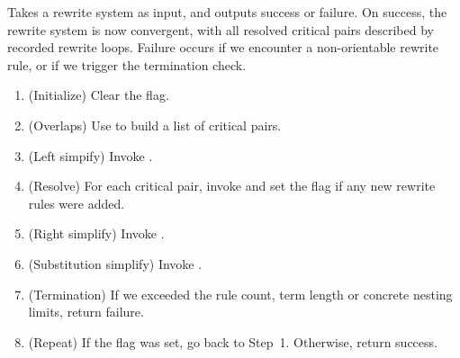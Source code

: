 \documentclass[../generics]{subfiles}
\begin{document}
\begin{algorithm}\label{knuthbendix} Takes a rewrite system as input, and outputs success or failure. On success, the rewrite system is now convergent, with all resolved critical pairs described by recorded rewrite loops. Failure occurs if we encounter a non-orientable rewrite rule, or if we trigger the termination check.
\begin{enumerate}
\item (Initialize) Clear the flag.
\item (Overlaps) Use  to build a list of critical pairs.
\item (Left simpify) Invoke .
\item (Resolve) For each critical pair, invoke  and set the flag if any new rewrite rules were added.
\item (Right simplify) Invoke .
\item (Substitution simplify) Invoke .
\item (Termination) If we exceeded the rule count, term length or concrete nesting limits, return failure.
\item (Repeat) If the flag was set, go back to Step~1. Otherwise, return success.
\end{enumerate}
\end{algorithm}
\end{document}
